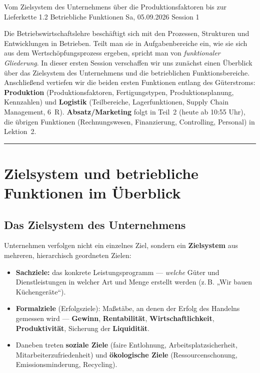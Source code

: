 \documentclass[11pt, a4paper]{article}
\begin{document}
%
  {Vom Zielsystem des Unternehmens über die Produktionsfaktoren bis zur Lieferkette}%
  {1.2 Betriebliche Funktionen}%
  {Sa, 05.09.2026 \textperiodcentered{} Session 1}

\begin{merksatz}[title={\bfseries Worum geht es in Teil 1?}]
Die Betriebswirtschaftslehre beschäftigt sich mit den Prozessen, Strukturen und
Entwicklungen in Betrieben. Teilt man sie in Aufgabenbereiche ein, wie sie sich aus dem
Wertschöpfungsprozess ergeben, spricht man von \emph{funktionaler Gliederung}. In dieser
ersten Session verschaffen wir uns zunächst einen Überblick über das Zielsystem des
Unternehmens und die betrieblichen Funktionsbereiche. Anschließend vertiefen wir die
beiden ersten Funktionen entlang des Güterstroms: \textbf{Produktion}
(Produktionsfaktoren, Fertigungstypen, Produktionsplanung, Kennzahlen) und
\textbf{Logistik} (Teilbereiche, Lagerfunktionen, Supply Chain Management, 6~R).
\textbf{Absatz/Marketing} folgt in Teil~2 (heute ab 10:55 Uhr), die übrigen Funktionen
(Rechnungswesen, Finanzierung, Controlling, Personal) in Lektion~2.
\end{merksatz}

\tableofcontents
\vspace{1em}
\hrule
\vspace{1em}

\section{Zielsystem und betriebliche Funktionen im Überblick}

\subsection{Das Zielsystem des Unternehmens}

Unternehmen verfolgen nicht ein einzelnes Ziel, sondern ein \textbf{Zielsystem} aus
mehreren, hierarchisch geordneten Zielen:

\begin{itemize}
  \item \textbf{Sachziele:} das konkrete Leistungsprogramm --- \emph{welche} Güter und
    Dienstleistungen in welcher Art und Menge erstellt werden (z.\,B. „Wir bauen
    Küchengeräte``).
  \item \textbf{Formalziele} (Erfolgsziele): Maßstäbe, an denen der Erfolg des Handelns
    gemessen wird --- \textbf{Gewinn}, \textbf{Rentabilität}, \textbf{Wirtschaftlichkeit},
    \textbf{Produktivität}, Sicherung der \textbf{Liquidität}.
  \item Daneben treten \textbf{soziale Ziele} (faire Entlohnung, Arbeitsplatzsicherheit,
    Mitarbeiterzufriedenheit) und \textbf{ökologische Ziele} (Ressourcenschonung,
    Emissionsminderung, Recycling).
\end{itemize}
\end{document}
